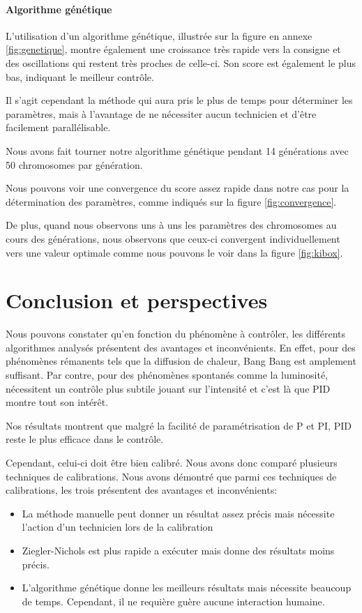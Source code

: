 \documentclass[a4paper,10pt]{report}
\begin{document}
\subsubsection{Algorithme génétique}
L'utilisation d'un algorithme génétique, illustrée sur la figure en annexe \ref{fig:genetique}, montre également une croissance très rapide vers la consigne et des oscillations qui restent très proches de celle-ci.
Son score est également le plus bas, indiquant le meilleur contrôle.

Il s'agit cependant la méthode qui aura pris le plus de temps pour déterminer les paramètres, mais à l'avantage de ne nécessiter aucun technicien et d'être facilement parallélisable.

Nous avons fait tourner notre algorithme génétique pendant 14 générations avec 50 chromosomes par génération.

Nous pouvons voir une convergence du score assez rapide dans notre cas pour la détermination des paramètres, comme indiqués sur la figure \ref{fig:convergence}.

De plus, quand nous observons uns à uns les paramètres des chromosomes au cours des générations, nous observons que ceux-ci convergent individuellement vers une valeur optimale comme nous pouvons le voir dans la figure \ref{fig:kibox}.


\chapter{Conclusion et perspectives}

Nous pouvons constater qu'en fonction du phénomène à contrôler, les différents algorithmes analysés présentent des avantages et inconvénients.
En effet, pour des phénomènes rémanents tels que la diffusion de chaleur, Bang Bang est amplement suffisant.
Par contre, pour des phénomènes spontanés comme la luminosité, nécessitent un contrôle plus subtile jouant sur l'intensité et c'est là que PID montre tout son intérêt.

Nos résultats montrent que malgré la facilité de paramétrisation de P et PI, PID reste le  plus efficace dans le contrôle.

Cependant, celui-ci doit être bien calibré.
Nous avons donc comparé plusieurs techniques de calibrations.
Nous avons démontré que parmi ces techniques de calibrations, les trois présentent des avantages et inconvénients:
\begin{itemize}
    \item La méthode manuelle peut donner un résultat assez précis mais nécessite l'action d'un technicien lors de la calibration
    \item Ziegler-Nichols est plus rapide a exécuter mais donne des résultats moins précis.
    \item L'algorithme génétique donne les meilleurs résultats mais nécessite beaucoup de temps. Cependant, il ne requière guère aucune interaction humaine.
\end{itemize}
\end{document}
